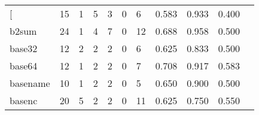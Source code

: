 \begin{longtable}{lp{1.20cm}p{1.20cm}p{1.20cm}p{1.20cm}p{1.20cm}p{1.20cm}p{1.20cm}p{1.20cm}p{1.20cm}p{1.20cm}}
\bottomrule
\endlastfoot
{[}         &                                    15 &                                                  1 &                                                  5 &                                                  3 &                                                  0 &                                                  6 &                                         0.583 &                                              0.933 &                                              0.400 \\
b2sum     &                                    24 &                                                  1 &                                                  4 &                                                  7 &                                                  0 &                                                 12 &                                         0.688 &                                              0.958 &                                              0.500 \\
base32    &                                    12 &                                                  2 &                                                  2 &                                                  2 &                                                  0 &                                                  6 &                                         0.625 &                                              0.833 &                                              0.500 \\
base64    &                                    12 &                                                  1 &                                                  2 &                                                  2 &                                                  0 &                                                  7 &                                         0.708 &                                              0.917 &                                              0.583 \\
basename  &                                    10 &                                                  1 &                                                  2 &                                                  2 &                                                  0 &                                                  5 &                                         0.650 &                                              0.900 &                                              0.500 \\
basenc    &                                    20 &                                                  5 &                                                  2 &                                                  2 &                                                  0 &                                                 11 &                                         0.625 &                                              0.750 &                                              0.550 \\

\end{longtable}
